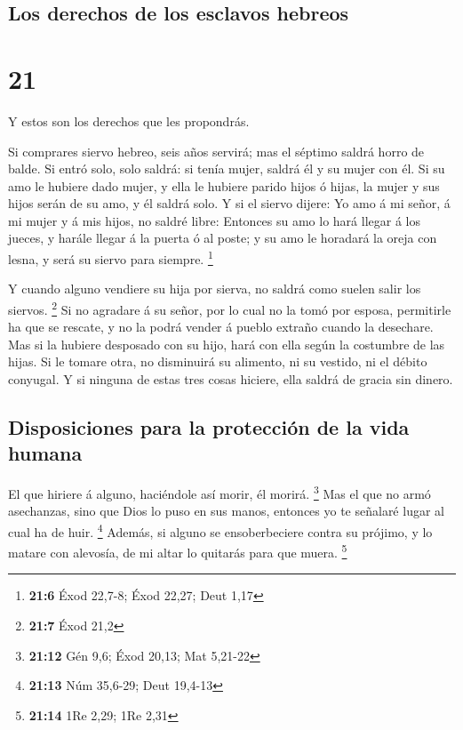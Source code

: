 \hypertarget{los-derechos-de-los-esclavos-hebreos}{%
\subsection{Los derechos de los esclavos
hebreos}\label{los-derechos-de-los-esclavos-hebreos}}

\hypertarget{section-20}{%
\section{21}\label{section-20}}

 Y estos son los derechos que les propondrás.

 Si comprares siervo hebreo, seis años servirá; mas el
séptimo saldrá horro de balde.  Si entró solo, solo
saldrá: si tenía mujer, saldrá él y su mujer con él.  Si
su amo le hubiere dado mujer, y ella le hubiere parido hijos ó hijas, la
mujer y sus hijos serán de su amo, y él saldrá solo.  Y si
el siervo dijere: Yo amo á mi señor, á mi mujer y á mis hijos, no saldré
libre:  Entonces su amo lo hará llegar á los jueces, y
harále llegar á la puerta ó al poste; y su amo le horadará la oreja con
lesna, y será su siervo para siempre. \footnote{\textbf{21:6} Éxod
  22,7-8; Éxod 22,27; Deut 1,17}

 Y cuando alguno vendiere su hija por sierva, no saldrá
como suelen salir los siervos. \footnote{\textbf{21:7} Éxod 21,2}
 Si no agradare á su señor, por lo cual no la tomó por
esposa, permitirle ha que se rescate, y no la podrá vender á pueblo
extraño cuando la desechare.  Mas si la hubiere desposado
con su hijo, hará con ella según la costumbre de las hijas.
 Si le tomare otra, no disminuirá su alimento, ni su
vestido, ni el débito conyugal.  Y si ninguna de estas
tres cosas hiciere, ella saldrá de gracia sin dinero.

\hypertarget{disposiciones-para-la-protecciuxf3n-de-la-vida-humana}{%
\subsection{Disposiciones para la protección de la vida
humana}\label{disposiciones-para-la-protecciuxf3n-de-la-vida-humana}}

 El que hiriere á alguno, haciéndole así morir, él
morirá. \footnote{\textbf{21:12} Gén 9,6; Éxod 20,13; Mat 5,21-22}
 Mas el que no armó asechanzas, sino que Dios lo puso en
sus manos, entonces yo te señalaré lugar al cual ha de huir. \footnote{\textbf{21:13}
  Núm 35,6-29; Deut 19,4-13}  Además, si alguno se
ensoberbeciere contra su prójimo, y lo matare con alevosía, de mi altar
lo quitarás para que muera. \footnote{\textbf{21:14} 1Re 2,29; 1Re 2,31}

